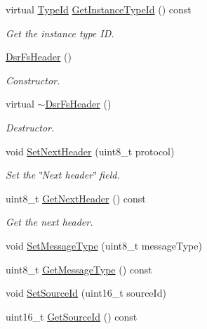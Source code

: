 \begin{DoxyCompactItemize}
\item 
virtual \hyperlink{classns3_1_1TypeId}{Type\+Id} \hyperlink{classns3_1_1dsr_1_1DsrFsHeader_a2446e9dc01d1dd460c6d8d9d31337699}{Get\+Instance\+Type\+Id} () const 
\begin{DoxyCompactList}\small\item\em Get the instance type ID. \end{DoxyCompactList}\item 
\hyperlink{classns3_1_1dsr_1_1DsrFsHeader_a2e2ffcf792a973ff3341911d4bb6d776}{Dsr\+Fs\+Header} ()
\begin{DoxyCompactList}\small\item\em Constructor. \end{DoxyCompactList}\item 
virtual \hyperlink{classns3_1_1dsr_1_1DsrFsHeader_acf4981bbe8a7d93b771bdfd7b2e606f8}{$\sim$\+Dsr\+Fs\+Header} ()
\begin{DoxyCompactList}\small\item\em Destructor. \end{DoxyCompactList}\item 
void \hyperlink{classns3_1_1dsr_1_1DsrFsHeader_a31fa870af83764f8de3e37b739e0df39}{Set\+Next\+Header} (uint8\+\_\+t protocol)
\begin{DoxyCompactList}\small\item\em Set the \char`\"{}\+Next header\char`\"{} field. \end{DoxyCompactList}\item 
uint8\+\_\+t \hyperlink{classns3_1_1dsr_1_1DsrFsHeader_aff0f05ec49bde5ba47d202494f537d72}{Get\+Next\+Header} () const 
\begin{DoxyCompactList}\small\item\em Get the next header. \end{DoxyCompactList}\item 
void \hyperlink{classns3_1_1dsr_1_1DsrFsHeader_ab53490ba4b796d8bc64e2387cb614808}{Set\+Message\+Type} (uint8\+\_\+t message\+Type)
\item 
uint8\+\_\+t \hyperlink{classns3_1_1dsr_1_1DsrFsHeader_ac782397dd7797f91623f64ac38cd6ed2}{Get\+Message\+Type} () const 
\item 
void \hyperlink{classns3_1_1dsr_1_1DsrFsHeader_a23f04e783e7f9e900bf17f173d96f4ee}{Set\+Source\+Id} (uint16\+\_\+t source\+Id)
\item 
uint16\+\_\+t \hyperlink{classns3_1_1dsr_1_1DsrFsHeader_a37a497f8e8a46f1de8b8b9e8df4f5a85}{Get\+Source\+Id} () const 

\end{DoxyCompactItemize}
